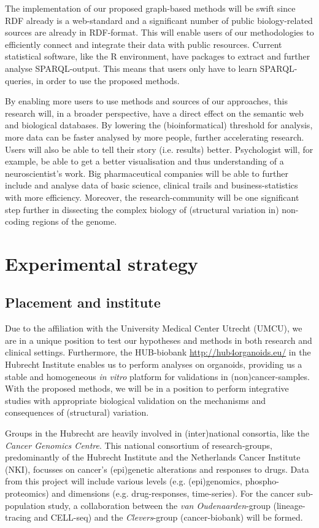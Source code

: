 \documentclass[twoside,fontsize=12pt]{article}
\begin{document}
\noindent
The implementation of our proposed graph-based methods will be swift since RDF already is a web-standard and a significant number of public biology-related sources are already in RDF-format. This will enable users of our methodologies to efficiently connect and integrate their data with public resources. Current statistical software, like the R environment, have packages to extract and further analyse SPARQL-output. This means that users only have to learn SPARQL-queries, in order to use the proposed methods.

By enabling more users to use methods and sources of our approaches, this research will, in a broader perspective, have a direct effect on the semantic web and biological databases. By lowering the (bioinformatical) threshold for analysis, more data can be faster analysed by more people, further accelerating research. Users will also be able to tell their story (i.e. results) better. Psychologist will, for example, be able to get a better visualisation and thus understanding of a neuroscientist's work. Big pharmaceutical companies will be able to further include and analyse data of basic science, clinical trails and business-statistics with more efficiency. Moreover, the research-community will be one significant step further in dissecting the complex biology of (structural variation in) non-coding regions of the genome.

\section*{Experimental strategy}
\subsection*{Placement and institute}
Due to the affiliation with the University Medical Center Utrecht (UMCU), we are in a unique position to test our hypotheses and methods in both research and clinical settings. Furthermore, the HUB-biobank \url{http://hub4organoids.eu/} in the Hubrecht Institute  enables us to perform analyses on organoids, providing us a stable and homogeneous \textit{in vitro} platform for validations in (non)cancer-samples. With the proposed methods, we will be in a position to perform integrative studies with appropriate biological validation on the mechanisms and consequences of (structural) variation. 

Groups in the Hubrecht are heavily involved in (inter)national consortia, like the \textit{Cancer Genomics Centre}. This national consortium of research-groups, predominantly of the Hubrecht Institute and the Netherlands Cancer Institute (NKI), focusses on cancer's (epi)genetic alterations and responses to drugs. Data from this project will include various levels (e.g. (epi)genomics, phospho-proteomics) and dimensions (e.g. drug-responses, time-series). For the cancer sub-population study, a collaboration between the \textit{van Oudenaarden}-group (lineage-tracing and CELL-seq) and the \textit{Clevers}-group (cancer-biobank) will be formed.
\end{document}
